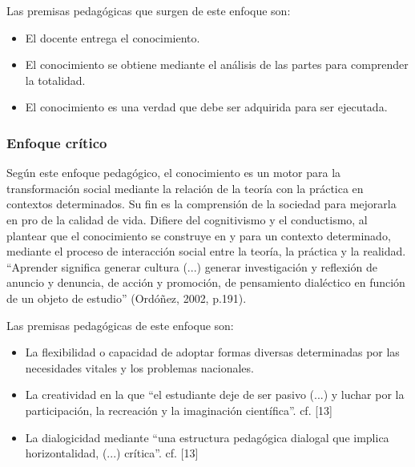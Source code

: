 Las premisas pedagógicas que surgen de este enfoque son: 


\begin{itemize}
    
    \color{blue} \item \color{black} El docente entrega el conocimiento. 


    
     \color{blue} \item \color{black} El conocimiento se obtiene mediante el análisis de las partes para comprender la totalidad. 
     
    \color{blue} \item \color{black} El conocimiento es una verdad que debe ser adquirida para ser ejecutada. 
    \end{itemize}


\subsubsection*{Enfoque crítico}

Según este enfoque pedagógico, el conocimiento es un motor para la transformación social mediante la relación de la teoría con la práctica en contextos determinados. Su fin es la comprensión de la sociedad para mejorarla en pro de la calidad de vida. Difiere del cognitivismo y el conductismo, al plantear que el conocimiento se construye en y para un contexto determinado, mediante el proceso de interacción social entre la teoría, la práctica y la realidad. “Aprender significa generar cultura (...) generar investigación y reflexión de anuncio y denuncia, de acción y promoción, de pensamiento dialéctico en función de un objeto de estudio” (Ordóñez, 2002, p.191). 

Las premisas pedagógicas de este enfoque son: 

\begin{itemize}
    
    \color{blue} \item \color{black} La flexibilidad o capacidad de adoptar formas diversas determinadas por las necesidades vitales y los problemas nacionales. 

     \color{blue} \item \color{black} La creatividad en la que “el estudiante deje de ser pasivo (...) y luchar por la participación, la recreación y la imaginación científica”. cf. [13]
     
    \color{blue} \item \color{black} La dialogicidad mediante “una estructura pedagógica dialogal que implica horizontalidad, (...) crítica”. cf. [13] 
    \end{itemize}
    
